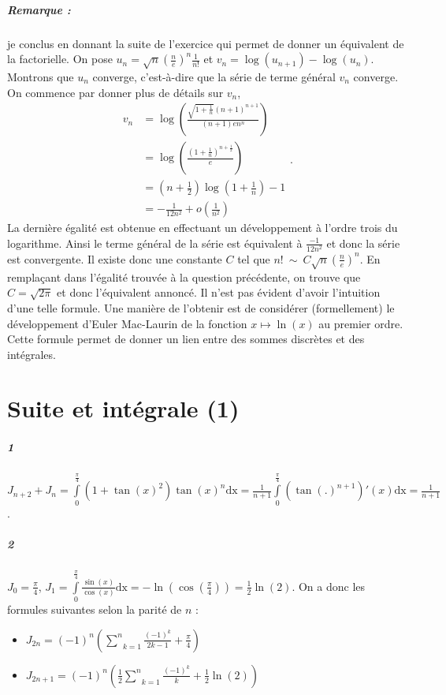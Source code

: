 \documentclass[10pt,a4paper]{article}
\begin{document}
\subparagraph{Remarque :} je conclus en donnant la suite de l'exercice qui permet de donner un équivalent de la factorielle. On pose $u_n = \sqrt{n} \left( \frac{n}{e} \right)^n \frac{1}{n!}$ et $v_n = \log(u_{n+1}) - \log(u_n)$. Montrons que $u_n$ converge, c'est-à-dire que la série de terme général $v_n$ converge. On commence par donner plus de détails sur $v_n$,
\begin{equation}
\begin{aligned}
v_n &= \log \left( \frac{\sqrt{1+\frac{1}{n}}(n+1)^{n+1}}{(n+1) e n^n} \right) \\
 &= \log \left( \frac{(1+ \frac{1}{n})^{n+\frac{1}{2}}}{e}\right) \\
 &= (n+\frac{1}{2}) \log(1+\frac{1}{n}) - 1 \\
 &= - \frac{1}{12n^2} + o(\frac{1}{n^2})
 \end{aligned}.
 \end{equation}
La dernière égalité est obtenue en effectuant un développement à l'ordre trois du logarithme. Ainsi le terme général de la série est équivalent à $\frac{-1}{12n^2}$ et donc la série est convergente. Il existe donc une constante $C$ tel que $n! \ \sim \ C \sqrt{n} \left( \frac{n}{e} \right)^n$. En remplaçant dans l'égalité trouvée à la question précédente, on trouve que $C = \sqrt{2\pi}$ et donc l'équivalent annoncé. Il n'est pas évident d'avoir l'intuition d'une telle formule. Une manière de l'obtenir est de considérer (formellement) le développement d'Euler Mac-Laurin de la fonction $x \mapsto \ln(x)$ au premier ordre. Cette formule permet de donner un lien entre des sommes discrètes et des intégrales.

\section{Suite et intégrale (1)}
\subparagraph{1} $J_{n+2} + J_n = \underset{0}{\overset{\frac{\pi}{4}}{\int}}(1+ \tan(x)^2) \tan(x)^n \text{dx} = \frac{1}{n+1} \underset{0}{\overset{\frac{\pi}{4}}{\int}} (\tan(.)^{n+1})'(x) \text{dx} = \frac{1}{n+1}$.
\subparagraph{2} $J_0 = \frac{\pi}{4}$, $J_1 = \underset{0}{\overset{\frac{\pi}{4}}{\int}} \frac{\sin(x)}{\cos(x)} \text{dx} = -\ln(\cos(\frac{\pi}{4})) = \frac{1}{2}\ln(2)$.
On a donc les formules suivantes selon la parité de $n$ :
\begin{itemize}
\item $J_{2n} = (-1)^n \left( \underset{k=1}{\overset{n}{\sum}}\frac{(-1)^k}{2k-1} + \frac{\pi}{4} \right)$
\item $J_{2n+1} = (-1)^n \left(\frac{1}{2}\underset{k=1}{\overset{n}{\sum}}\frac{(-1)^k}{k} + \frac{1}{2}\ln(2) \right)$
\end{itemize}
\end{document}
